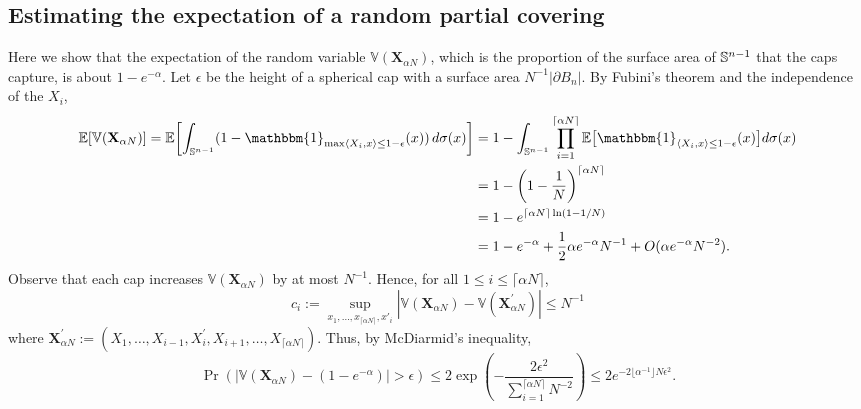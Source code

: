 \subsection{Estimating the expectation of a random partial covering}\label{expectationsection}
Here we show that the expectation of the random variable $\mathbb{V}(\mathbf{X}_{\alpha N})$, which is the proportion of the surface area of $\mathbb{S}^{n-1}$ that the caps capture, is about $ 1-e^{-\alpha}.$ Let $\epsilon$ be the height of a spherical cap with a surface area $N^{-1}|\partial B_n|$. By Fubini's theorem and the independence of the $X_i$,
\begin{equation}\label{indepRV}
\begin{aligned} \E[\mathbb{V}(\mathbf{X}_{\alpha N})]=\E\left[\int_{\mathbb{S}^{n-1}}(1 -\mathbbm{1}_{\max\langle X_{i},x\rangle\leq 1-\epsilon}(x))\,d\sigma(x)\right]  &=1 -\int_{\mathbb{S}^{n-1}}\prod_{i=1}^{\lceil \alpha N \rceil}\E\big[\mathbbm{1}_{\langle X_{i},x\rangle\leq 1-\epsilon}(x)\big]d\sigma(x)\\
&= 1 - \left(1-\frac{1}{N}\right)^{\lceil \alpha N \rceil}
\\& =1 - e^{\lceil\alpha N\rceil  \ln(1-1/N)}
\\
&=1 - e^{-\alpha} + \frac{1}{2}\alpha e^{-\alpha} N^{-1} +O( \alpha e^{-\alpha} N^{-2}).
\end{aligned}
\end{equation}
Observe that each cap increases $ \mathbb{V}(\mathbf{X}_{\alpha N}) $ by at most $ N^{-1}$. Hence, for all $ 1\leq i \leq \lceil \alpha N \rceil $,
	\[
	c_i:=\sup_{ x_1,\ldots,x_{\lceil \alpha N \rceil},x'_i} | \mathbb{V}(\mathbf{X}_{\alpha N})- \mathbb{V}(\mathbf{X}_{\alpha N}^\prime)| \leq N^{-1}
	\]
	where $\mathbf{X}_{\alpha N}^\prime:=(X_1,\ldots,X_{i-1},X_i^\prime,X_{i+1},\ldots,X_{\lceil \alpha N \rceil})$. Thus, by McDiarmid's inequality, 
	\[
	\Pr(|\mathbb{V}(\mathbf{X}_{\alpha N}) - (1-e^{-\alpha})| > \epsilon) \leq 2\exp\left(-\frac{2\epsilon^2}{\sum_{i=1}^{\lceil \alpha N \rceil}N^{-2}}\right) \leq 2e^{-2\lfloor \alpha^{-1}\rfloor N\epsilon^2}.
	\]

